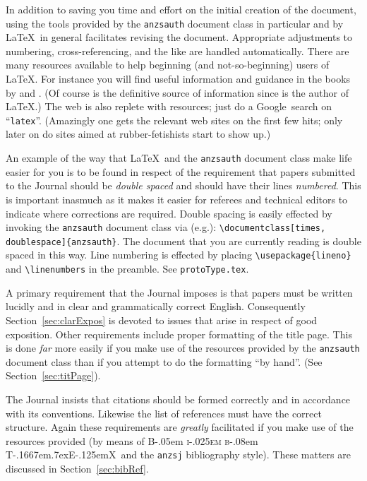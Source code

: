 \documentclass[times, doublespace]{anzsauth}
\newcommand\BibTeX{{\rmfamily B\kern-.05em \textsc{i\kern-.025em b}\kern-.08em
T\kern-.1667em\lower.7ex\hbox{E}\kern-.125emX}}
\begin{document}
In addition to saving you time and effort on the initial creation
of the document, using the tools provided by the \texttt{anzsauth}
document class in particular and by \LaTeX\ in general facilitates
revising the document.  Appropriate adjustments to numbering,
cross-referencing, and the like are handled automatically.  There are
many resources available to help beginning (and not-so-beginning)
users of \LaTeX.  For instance you will find useful information
and guidance in the books by \cite{KopkaDaly2003, Lamport1994} and
\cite{MittelbachGoossens2004}.  (Of course \citealt{Lamport1994} is
the definitive source of information since \citeauthor{Lamport1994}
is the author of \LaTeX.)  The web is also replete with resources;
just do a Google\texttrademark\ search on ``\texttt{latex}''.
(Amazingly one gets the relevant web sites on the first few hits;
only later on do sites aimed at rubber-fetishists start to show up.)

An example of the way that \LaTeX\ and the \texttt{anzsauth}
document class make life easier for you is to be found in respect
of the requirement that papers submitted to the Journal should be
\emph{double spaced} and should have their lines \emph{numbered}.
This is important inasmuch as it makes it easier for referees and
technical editors to indicate where corrections are required.  Double
spacing is easily effected by invoking the \texttt{anzsauth} document
class via (e.g.): \label{pg:dsln}
\verb!\documentclass[times, doublespace]{anzsauth}!.
The document that you are currently reading is double
spaced in this way.  Line numbering is effected by placing
\verb!\usepackage{lineno}! and \verb!\linenumbers! in the preamble.
See \texttt{protoType.tex}.

A primary requirement that the Journal imposes is that papers must
be written lucidly and in clear and grammatically correct English.
Consequently Section~\ref{sec:clarExpos} is devoted to issues that
arise in respect of good exposition.  Other requirements include
proper formatting of the title page.  This is done \emph{far}
more easily if you make use of the resources provided by the
\texttt{anzsauth} document class than if you attempt to do the
formatting ``by hand''.  (See Section~\ref{sec:titPage}).

The Journal insists that citations should be formed correctly and in
accordance with its conventions.  Likewise the list of references
must have the correct structure.  Again these requirements are
\emph{greatly} facilitated if you make use of the resources provided
(by means of \BibTeX\ and the \texttt{anzsj} bibliography style).
These matters are discussed in Section~\ref{sec:bibRef}.
\end{document}
